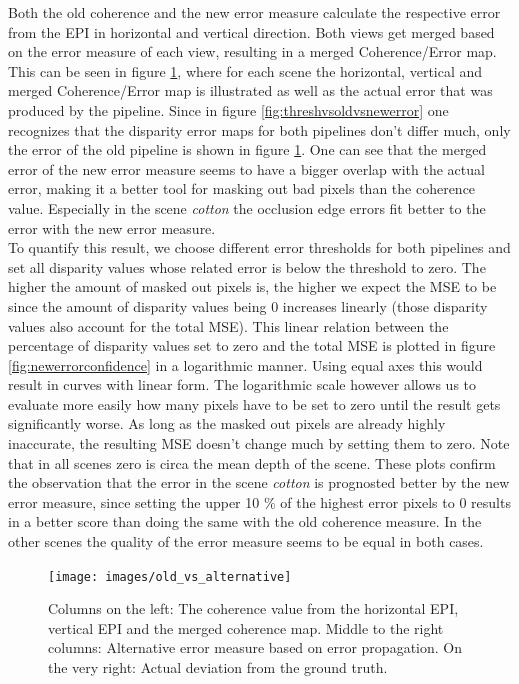 \documentclass  [
  paper    = a4,
  BCOR     = 10mm,
  twoside,
  fontsize = 12pt,
  fleqn,
  toc      = bibnumbered,
  toc      = listofnumbered,
  numbers  = noendperiod,
  headings = normal,
  listof   = leveldown,
  version  = 3.03
]                                       {scrreprt}
\begin{document}
Both the old coherence and the new error measure calculate the respective error from the EPI in horizontal and vertical direction. Both views get merged based on the error measure of each view, resulting in a merged Coherence/Error map. This can be seen in figure \ref{fig:oldvsalternative}, where for each scene the horizontal, vertical and merged Coherence/Error map is illustrated as well as the actual error that was produced by the pipeline. Since in figure \ref{fig:threshvsoldvsnewerror} one recognizes that the disparity error maps for both pipelines don't differ much, only the error of the old pipeline is shown in figure \ref{fig:oldvsalternative}. One can see that the merged error of the new error measure seems to have a bigger overlap with the actual error, making it a better tool for masking out bad pixels than the coherence value. Especially in the scene \textit{cotton} the occlusion edge errors fit better to the error with the new error measure.\\
To quantify this result, we choose different error thresholds for both pipelines and set all disparity values whose related error is below the threshold to zero. The higher the amount of masked out pixels is, the higher we expect the MSE to be since the amount of disparity values being 0 increases linearly (those disparity values also account for the total MSE). This linear relation between the percentage of disparity values set to zero and the total MSE is plotted in figure \ref{fig:newerrorconfidence} in a logarithmic manner. Using equal axes this would result in curves with linear form. The logarithmic scale however allows us to evaluate more easily how many pixels have to be set to zero until the result gets significantly worse. As long as the masked out pixels are already highly inaccurate, the resulting MSE doesn't change much by setting them to zero. Note that in all scenes zero is circa the mean depth of the scene. These plots confirm the observation that the error in the scene \textit{cotton} is prognosted better by the new error measure, since setting the upper 10 $\%$ of the highest error pixels to 0 results in a better score than doing the same with the old coherence measure. In the other scenes the quality of the error measure seems to be equal in both cases. 
\begin{figure}
	\centering
	\texttt{[image: images/old\_vs\_alternative]}
	\caption[Old error vs New Error]{Columns on the left: The coherence value from the horizontal EPI, vertical EPI and the merged coherence map. Middle to the right columns: Alternative error measure based on error propagation. On the very right: Actual deviation from the ground truth.}
	\label{fig:oldvsalternative}
\end{figure}
\end{document}
